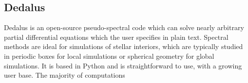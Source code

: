{\color{purple}    
\subsection{Dedalus}}

Dedalus is an open-source pseudo-spectral code which can solve nearly arbitrary partial differential equations which the user specifies in plain text. Spectral methods are ideal for simulations of stellar interiors, which are typically studied in periodic boxes for local simulations or spherical geometry for global simulations. It is based in Python and is straightforward to use, with a growing user base. The majority of computations 


